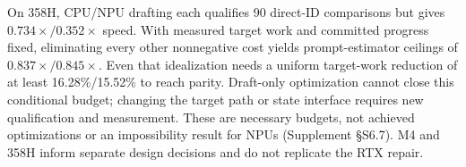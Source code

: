 On 358H, CPU/NPU drafting each qualifies 90 direct-ID comparisons but gives $0.734\times/0.352\times$ speed. With measured target work and committed progress fixed, eliminating every other nonnegative cost yields prompt-estimator ceilings of $0.837\times/0.845\times$. Even that idealization needs a uniform target-work reduction of at least 16.28\%/15.52\% to reach parity. Draft-only optimization cannot close this conditional budget; changing the target path or state interface requires new qualification and measurement. These are necessary budgets, not achieved optimizations or an impossibility result for NPUs (Supplement \S S6.7). M4 and 358H inform separate design decisions and do not replicate the RTX repair.
\FloatBarrier
